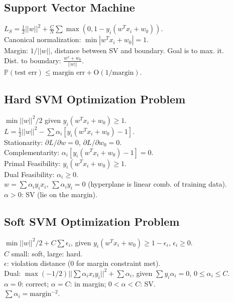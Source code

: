 \subsection*{Support Vector Machine}

$L_S = \frac{1}{2}||w||^2 + \frac{C}{N} \sum \max(0, 1-y_i(w^T x_i + w_0))$.\\
Canonical normalization: $\min |w^T x_i + w_0| = 1$.\\
Margin: $1/||w||$, distance between SV and boundary. Goal is to max. it.\\
Dist. to boundary: $\frac{w^x + w_0}{||w||}$.\\
$\mathbb{P}(\text{test err}) \leq \text{margin err} + \text{O}(1/\text{margin})$.

\subsection*{Hard SVM Optimization Problem}

$\min ||w||^2/2$ given $y_i(w^T x_i + w_0) \geq 1$.\\
$L = \frac{1}{2} ||w||^2 - \sum \alpha_i [y_i(w^T x_i + w_0) - 1]$.\\
Stationarity: ${\partial L}/{\partial w}=0$, ${\partial L}/{\partial w_0} = 0$.\\
Complementarity: $\alpha_i [y_i (w^T x_i + w_0) - 1] = 0$.\\
Primal Feasibility: $y_i (w^T x_i + w_0) \geq 1$.\\
Dual Feasibility: $\alpha_i \geq 0$.\\
$w = \sum \alpha_i y_i x_i$, $\sum \alpha_i y_i = 0$ (hyperplane is linear comb. of training data).\\
$\alpha > 0$: SV (lie on the margin).

\subsection*{Soft SVM Optimization Problem}

$\min ||w||^2/2 + C \sum \epsilon_i$, given $y_i(w^T x_i + w_0) \geq 1 - \epsilon_i$, $\epsilon_i \geq 0$.\\
$C$ small: soft, large: hard.\\
$\epsilon$: violation distance (0 for margin constraint met).\\
Dual: $\max (-1/2) ||\sum \alpha_i x_i y_i||^2 + \sum \alpha_i$, given $\sum y_i \alpha_i = 0$, $0 \leq \alpha_i \leq C$.\\
$\alpha=0$: correct; $\alpha=C$: in margin; $0 < \alpha < C$: SV.\\
$\sum \alpha_i = \text{margin}^{-2}$.

